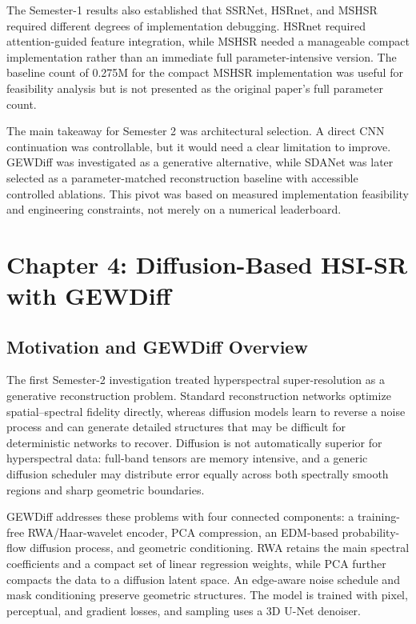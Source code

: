 \documentclass[10pt,twocolumn,letterpaper]{article}
\begin{document}
The Semester-1 results also established that SSRNet, HSRnet, and MSHSR required different degrees of implementation debugging. HSRnet required attention-guided feature integration, while MSHSR needed a manageable compact implementation rather than an immediate full parameter-intensive version. The baseline count of 0.275M for the compact MSHSR implementation was useful for feasibility analysis but is not presented as the original paper's full parameter count.

The main takeaway for Semester 2 was architectural selection. A direct CNN continuation was controllable, but it would need a clear limitation to improve. GEWDiff was investigated as a generative alternative, while SDANet was later selected as a parameter-matched reconstruction baseline with accessible controlled ablations. This pivot was based on measured implementation feasibility and engineering constraints, not merely on a numerical leaderboard.

\section{Chapter 4: Diffusion-Based HSI-SR with GEWDiff}
\label{sec:gew-diffusion}

\subsection{Motivation and GEWDiff Overview}

The first Semester-2 investigation treated hyperspectral super-resolution as a generative reconstruction problem. Standard reconstruction networks optimize spatial--spectral fidelity directly, whereas diffusion models learn to reverse a noise process and can generate detailed structures that may be difficult for deterministic networks to recover. Diffusion is not automatically superior for hyperspectral data: full-band tensors are memory intensive, and a generic diffusion scheduler may distribute error equally across both spectrally smooth regions and sharp geometric boundaries.

GEWDiff addresses these problems with four connected components: a training-free RWA/Haar-wavelet encoder, PCA compression, an EDM-based probability-flow diffusion process, and geometric conditioning. RWA retains the main spectral coefficients and a compact set of linear regression weights, while PCA further compacts the data to a diffusion latent space. An edge-aware noise schedule and mask conditioning preserve geometric structures. The model is trained with pixel, perceptual, and gradient losses, and sampling uses a 3D U-Net denoiser.
\end{document}
